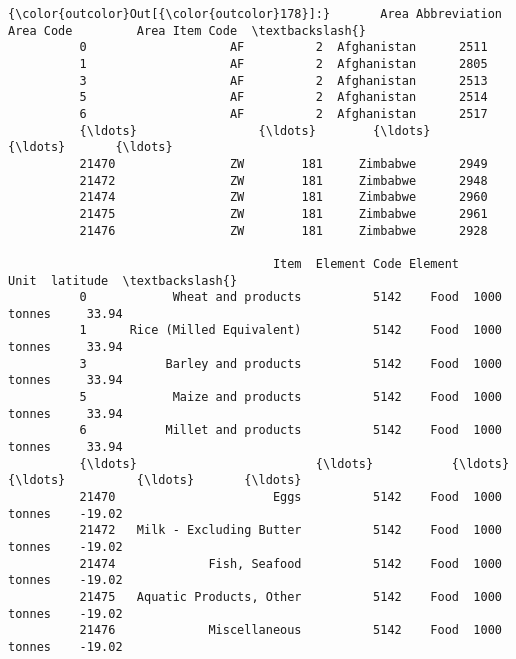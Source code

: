\documentclass[11pt]{article}
\begin{document}
\begin{Verbatim}[commandchars=\\\{\}]
{\color{outcolor}Out[{\color{outcolor}178}]:}       Area Abbreviation  Area Code         Area Item Code  \textbackslash{}
          0                    AF          2  Afghanistan      2511   
          1                    AF          2  Afghanistan      2805   
          3                    AF          2  Afghanistan      2513   
          5                    AF          2  Afghanistan      2514   
          6                    AF          2  Afghanistan      2517   
          {\ldots}                 {\ldots}        {\ldots}          {\ldots}       {\ldots}   
          21470                ZW        181     Zimbabwe      2949   
          21472                ZW        181     Zimbabwe      2948   
          21474                ZW        181     Zimbabwe      2960   
          21475                ZW        181     Zimbabwe      2961   
          21476                ZW        181     Zimbabwe      2928   
          
                                     Item  Element Code Element         Unit  latitude  \textbackslash{}
          0            Wheat and products          5142    Food  1000 tonnes     33.94   
          1      Rice (Milled Equivalent)          5142    Food  1000 tonnes     33.94   
          3           Barley and products          5142    Food  1000 tonnes     33.94   
          5            Maize and products          5142    Food  1000 tonnes     33.94   
          6           Millet and products          5142    Food  1000 tonnes     33.94   
          {\ldots}                         {\ldots}           {\ldots}     {\ldots}          {\ldots}       {\ldots}   
          21470                      Eggs          5142    Food  1000 tonnes    -19.02   
          21472   Milk - Excluding Butter          5142    Food  1000 tonnes    -19.02   
          21474             Fish, Seafood          5142    Food  1000 tonnes    -19.02   
          21475   Aquatic Products, Other          5142    Food  1000 tonnes    -19.02   
          21476             Miscellaneous          5142    Food  1000 tonnes    -19.02   
          

\end{Verbatim}
\end{document}
